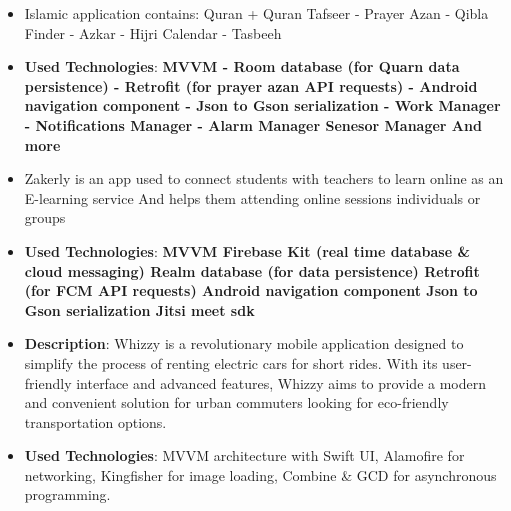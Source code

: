 \documentclass[10pt,a4paper,ragged2e,withhyper]{altacv}
\begin{document}
    \begin{itemize}
        \item \textbf{}Islamic application contains:
        Quran + Quran Tafseer - Prayer Azan - Qibla Finder - Azkar - Hijri Calendar - Tasbeeh
        \item \textbf{Used Technologies}: \textbf{MVVM - Room database (for Quarn data persistence) - Retrofit (for prayer azan API requests) - Android navigation component - Json to Gson serialization - Work Manager - Notifications Manager - Alarm Manager Senesor Manager And more}
    \end{itemize}
    \divider



    \begin{itemize}
        \item \textbf{}Zakerly is an app used to connect students with teachers to learn online as an E-learning service And helps them attending online sessions individuals or groups
        \item \textbf{Used Technologies}: \textbf{MVVM Firebase Kit (real time database \& cloud messaging) Realm database (for data persistence) Retrofit (for FCM API requests) Android navigation component Json to Gson serialization Jitsi meet sdk}
    \end{itemize}
    \divider


    \vspace{6px}
    \vspace{2px}


    \hypertarget{whizzy}{}
    \begin{itemize}
        \item \textbf{Description}: Whizzy is a revolutionary mobile application designed to simplify the process of renting electric cars for short rides. With its user-friendly interface and advanced features, Whizzy aims to provide a modern and convenient solution for urban commuters looking for eco-friendly transportation options.
        \item \textbf{Used Technologies}: MVVM architecture with Swift UI, Alamofire for networking, Kingfisher for image loading, Combine & GCD for asynchronous programming.
    \end{itemize}
    \divider
\end{document}
